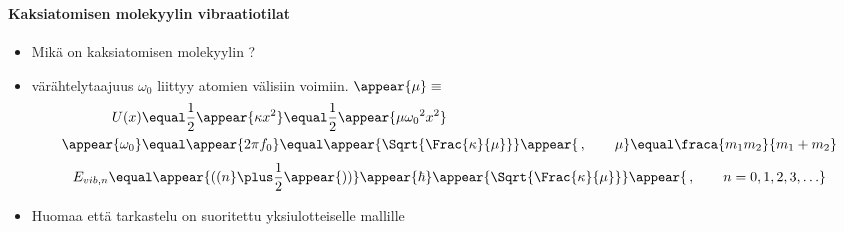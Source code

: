 \begin{frame}
\frametitle{\texorpdfstring{\culine[\sectiontitleulinecolor]{\sectiontitle}}{\sectiontitle} }
\framesubtitle{Kaksiatomisen molekyylin vibraatiotilat}
\appear{}

\begin{itemize}
	\item Mikä on kaksiatomisen molekyylin ? 
	
	\item värähtelytaajuus $\omega_{0}$ liittyy atomien välisiin voimiin.   \appear{(}$\appear{\mu}\equiv$ 
\[
\begin{aligned}
U(x)&  \equal \frac{1}{2} \appear{\kappa x^{2}}  \equal \frac{1}{2} \appear{\mu \omega_{0}{ }^{2} x^{2}} \\
\appear{\omega_{0}}&  \equal \appear{2 \pi f_{0}}  \equal \appear{\Sqrt{\Frac{\kappa}{\mu}} }\appear{\,, \qquad \mu}  \equal \fraca{m_{1} m_{2}}{m_{1}+m_{2}}
\end{aligned}
\]
\[ 
 E_{v i b, n}  \equal  \appear{\textrm{((}n}  \plus \frac{1}{2} \appear{\textrm{))}} \appear{\hbar} \appear{\Sqrt{\Frac{\kappa}{\mu}}} \appear{\,, \qquad n=0,1,2,3, \ldots }
 \]

\item Huomaa että tarkastelu on suoritettu yksiulotteiselle mallille
\end{itemize}

\endofslide 
\end{frame}

